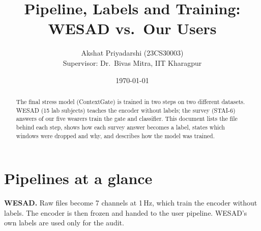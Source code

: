 \documentclass[11pt,a4paper]{article}
\title{\textbf{Pipeline, Labels and Training:\\ WESAD vs.\ Our Users}}
\author{Akshat Priyadarshi (23CS30003)\\ \small Supervisor: Dr.\ Bivas Mitra, IIT Kharagpur}
\date{\today}
\begin{document}
\maketitle

\begin{abstract}
\noindent The final stress model (ContextGate) is trained in two steps on two different datasets.
WESAD (15 lab subjects) teaches the encoder without labels; the survey (STAI-6) answers of our five
wearers train the gate and classifier. This document lists the file behind each step, shows how each
survey answer becomes a label, states which windows were dropped and why, and describes how the model
was trained.
\end{abstract}

\section{Pipelines at a glance}
\textbf{WESAD.} Raw files become 7 channels at 1\,Hz, which train the encoder without labels. The
encoder is then frozen and handed to the user pipeline. WESAD's own labels are used only for the audit.
\end{document}
